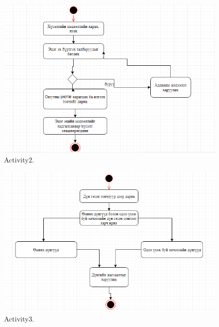 \documentclass[12pt]{article}
\begin{document}
\begin{figure}
	\caption{Activity2.}
	\label{fig:a2}
	\includegraphics[width=\linewidth]{A2.png}
\end{figure}
\begin{figure}
	\caption{Activity3.}
	\label{fig:a3}
	\includegraphics[width=\linewidth]{A3.png}
\end{figure}
\end{document}
